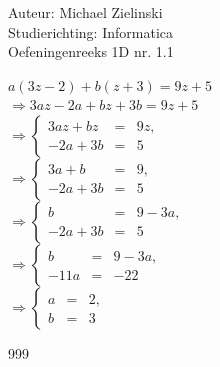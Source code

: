 \documentclass[a4paper]{article}
\begin{document}
  
\noindent \large Auteur: Michael Zielinski \\
\noindent \large Studierichting: Informatica\\
\noindent \large Oefeningenreeks 1D nr. 1.1\\

\medskip

\normalsize

$a(3z - 2) + b(z + 3) = 9z + 5$\\

$\Rightarrow 3az - 2a + bz + 3b = 9z + 5$\\

$\Rightarrow\left\{
    \begin{array}{lll}
        3az + bz      & = & 9z,\\
        -2a + 3b      & = & 5
    \end{array}
\right.$\\

$\Rightarrow\left\{
    \begin{array}{lll}
        3a + b        & = & 9,\\
        -2a + 3b      & = & 5
    \end{array}
\right.$\\

$\Rightarrow\left\{
    \begin{array}{lll}
        b             & = & 9 - 3a,\\
        -2a + 3b      & = & 5
    \end{array}
\right.$\\

$\Rightarrow\left\{
    \begin{array}{lll}
        b             & = & 9 - 3a,\\
        -11a          & = & -22
    \end{array}
\right.$\\

$\Rightarrow\left\{
    \begin{array}{lll}
        a             & = & 2,\\
        b             & = & 3
    \end{array}
\right.$

\begin{thebibliography}{999}
\end{thebibliography}
\end{document}
